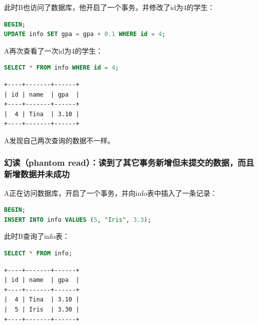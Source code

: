 \documentclass[12pt, openany, oneside]{book}
\begin{document}
此时B也访问了数据库，他开启了一个事务，并修改了id为4的学生：

\vspace{-0.5cm}

\begin{lstlisting}[language=SQL]
BEGIN;
UPDATE info SET gpa = gpa + 0.1 WHERE id = 4;
\end{lstlisting}

A再次查看了一次id为4的学生：

\vspace{-0.5cm}

\begin{lstlisting}[language=SQL]
SELECT * FROM info WHERE id = 4;
\end{lstlisting}

\begin{tcolorbox}
\begin{verbatim}
+----+-------+------+
| id | name  | gpa  |
+----+-------+------+
|  4 | Tina  | 3.10 |
+----+-------+------+
	\end{verbatim}
\end{tcolorbox}

A发现自己两次查询的数据不一样。

\subsubsection{幻读（phantom read）：读到了其它事务新增但未提交的数据，而且新增数据并未成功}

A正在访问数据库，开启了一个事务，并向info表中插入了一条记录：

\vspace{-0.5cm}

\begin{lstlisting}[language=SQL]
BEGIN;
INSERT INTO info VALUES (5, "Iris", 3.3);
\end{lstlisting}

此时B查询了info表：

\vspace{-0.5cm}

\begin{lstlisting}[language=SQL]
SELECT * FROM info;
\end{lstlisting}

\begin{tcolorbox}
\begin{verbatim}
+----+-------+------+
| id | name  | gpa  |
+----+-------+------+
|  4 | Tina  | 3.10 |
|  5 | Iris  | 3.30 |
+----+-------+------+
	\end{verbatim}
\end{tcolorbox}
\end{document}
